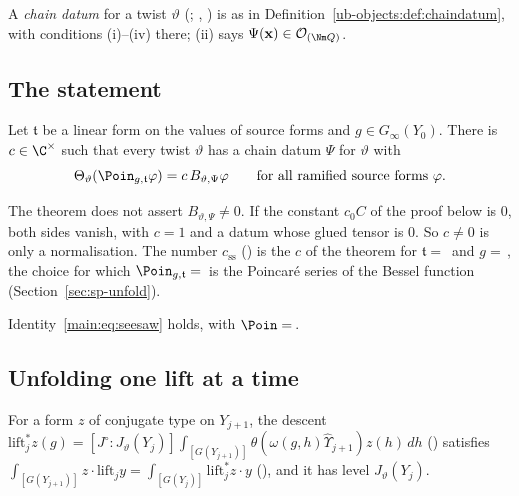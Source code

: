 A \emph{chain datum} for a twist $\vartheta$ (; ,
) is as in Definition~\ref{ub-objects:def:chaindatum}, with
conditions (i)--(iv) there; (ii) says $\Psi(\mathbf x)\in\mathcal O_{(\Nm Q)}$.

\subsection{The statement}

\begin{theorem}\label{ub-seesaw:thm:seesaw}
Let $\mathfrak t$ be a linear form on the values of source forms and $g\in G_\infty(Y_0)$. There is
$c\in\C^\times$ such that every twist $\vartheta$ has a chain datum $\Psi$ for $\vartheta$ with
\[
  \Theta_\vartheta(\Poin_{g,\mathfrak t}\varphi)=c\,B_{\vartheta,\Psi}\varphi
  \qquad\text{for all ramified source forms }\varphi .
\]
\end{theorem}

\begin{remark}\label{ub-seesaw:rem:weak}
The theorem does not assert $B_{\vartheta,\Psi}\neq0$. If the
constant $c_0C$ of the proof below is $0$, both sides vanish, with $c=1$ and a datum whose glued
tensor is $0$. So $c\neq0$ is only a normalisation. The number $c_{\mathrm{ss}}$ () is the $c$
of the theorem for $\mathfrak t=$\, and $g=$\,, the choice for which
$\Poin_{g,\mathfrak t}=$\, is the Poincar\'e series of the Bessel function
(Section~\ref{sec:sp-unfold}).
\end{remark}

\begin{corollary}\label{ub-seesaw:cor:used}
Identity~\eqref{main:eq:seesaw} holds, with $\Poin=$\,.
\end{corollary}

\subsection{Unfolding one lift at a time}

For a form $z$ of conjugate type on $Y_{j+1}$, the descent
$\mathrm{lift}_j^{*}z(g)=[J^\circ:J_\vartheta(Y_j)]\int_{[G(Y_{j+1})]}\theta(\omega(g,h)\widehat\Upsilon_{j+1})z(h)\,dh$
() satisfies
$\int_{[G(Y_{j+1})]}z\cdot\mathrm{lift}_jy=\int_{[G(Y_j)]}\mathrm{lift}_j^*z\cdot y$
(), and it has level $J_\vartheta(Y_j)$.

